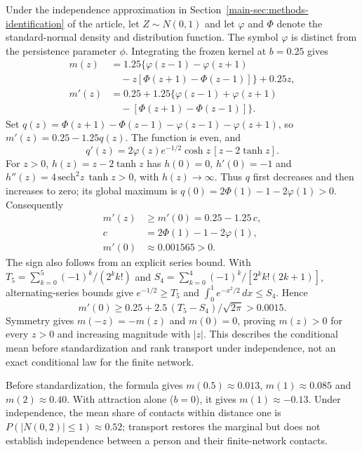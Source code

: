 Under the independence approximation in Section~\ref{main-sec:methods-identification} of the article, let $Z\sim N(0,1)$ and let $\varphi$ and $\Phi$ denote the standard-normal density and distribution function. The symbol $\varphi$ is distinct from the persistence parameter $\phi$. Integrating the frozen kernel at $b=0.25$ gives
\begin{align*}
m(z)&=1.25\bigl\{\varphi(z-1)-\varphi(z+1)\\
    &\quad-z[\Phi(z+1)-\Phi(z-1)]\bigr\}+0.25z,\\
m'(z)&=0.25+1.25\bigl\{\varphi(z-1)+\varphi(z+1)\\
     &\quad-[\Phi(z+1)-\Phi(z-1)]\bigr\}.
\end{align*}
Set $q(z)=\Phi(z+1)-\Phi(z-1)-\varphi(z-1)-\varphi(z+1)$, so $m'(z)=0.25-1.25q(z)$. The function is even, and
\begin{equation*}
q'(z)=2\varphi(z)e^{-1/2}\cosh z\,[z-2\tanh z].
\end{equation*}
For $z>0$, $h(z)=z-2\tanh z$ has $h(0)=0$, $h'(0)=-1$ and $h''(z)=4\,\mathrm{sech}^2z\,\tanh z>0$, with $h(z)\to\infty$. Thus $q$ first decreases and then increases to zero; its global maximum is $q(0)=2\Phi(1)-1-2\varphi(1)>0$. Consequently
\begin{align*}
m'(z)&\ge m'(0)=0.25-1.25\,c,\\
c&=2\Phi(1)-1-2\varphi(1),\\
m'(0)&\approx0.001565>0.
\end{align*}
The sign also follows from an explicit series bound. With $T_5=\sum_{k=0}^{5}(-1)^k/(2^k k!)$ and $S_4=\sum_{k=0}^{4}(-1)^k/[2^k k!(2k+1)]$, alternating-series bounds give $e^{-1/2}\ge T_5$ and $\int_0^1e^{-x^2/2}\,dx\le S_4$. Hence
\begin{equation*}
m'(0)\ge0.25+2.5\,(T_5-S_4)/\sqrt{2\pi}>0.0015.
\end{equation*}
Symmetry gives $m(-z)=-m(z)$ and $m(0)=0$, proving $m(z)>0$ for every $z>0$ and increasing magnitude with $|z|$. This describes the conditional mean before standardization and rank transport under independence, not an exact conditional law for the finite network.

Before standardization, the formula gives $m(0.5)\approx0.013$, $m(1)\approx0.085$ and $m(2)\approx0.40$. With attraction alone ($b=0$), it gives $m(1)\approx-0.13$. Under independence, the mean share of contacts within distance one is $P(|N(0,2)|\le1)\approx0.52$; transport restores the marginal but does not establish independence between a person and their finite-network contacts. %

